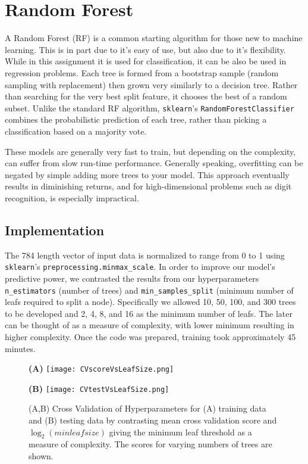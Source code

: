 \documentclass{article}
\begin{document}
\section{Random Forest}
A Random Forest (RF) is a common starting algorithm for those new to machine learning. This is in part due to it's easy of use, but also due to it's flexibility. While in this assignment it is used for classification, it can be also be used in regression problems. Each tree is formed from a bootstrap sample (random sampling with replacement) then grown very similarly to a decision tree. Rather than searching for the very best split feature, it chooses the best of a random subset. Unlike the standard RF algorithm, \verb+sklearn+'s \verb+RandomForestClassifier+ combines the probabilistic prediction of each tree, rather than picking a classification based on a majority vote. 

These models are generally very fast to train, but depending on the complexity, can suffer from slow run-time performance. Generally speaking, overfitting can be negated by simple adding more trees to your model. This approach eventually results in diminishing returns, and for high-dimensional problems such as digit recognition, is especially impractical.

\subsection{Implementation}
The 784 length vector of input data is normalized to range from 0 to 1 using \verb+sklearn+'s \verb+preprocessing.minmax_scale+. In order to improve our model's predictive power, we contrasted the results from our hyperparameters \verb+n_estimators+ (number of trees) and  \verb+min_samples_split+ (minimum number of leafs required to split a node). Specifically we allowed 10, 50, 100, and 300 trees to be developed and 2, 4, 8, and 16 as the minimum number of leafs. The later can be thought of as a measure of complexity, with lower minimum resulting in higher complexity. Once the code was prepared, training took approximately 45 minutes. 
\begin{figure}[h]
    \centering
    \begin{minipage}[t]{0.45\textwidth}
        \centering
        \textbf{(A)}
        \texttt{[image: CVscoreVsLeafSize.png]}
    \end{minipage}
    \begin{minipage}[t]{0.45\textwidth}
        \centering
        \textbf{(B)}
        \texttt{[image: CVtestVsLeafSize.png]}
    \end{minipage}
\caption{(A,B) Cross Validation of Hyperparameters for (A) training data and (B) testing data by contrasting mean cross validation score and $\log_2(minleafsize)$ giving the minimum leaf threshold as a measure of complexity. The scores for varying numbers of trees are shown.}
\end{figure}
\end{document}
